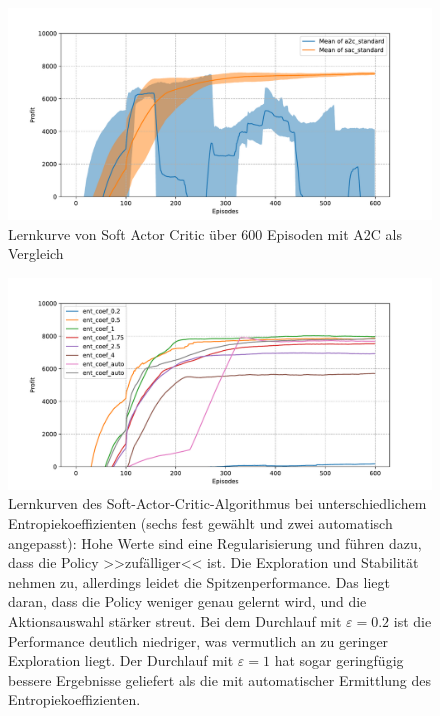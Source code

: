\begin{figure}[htb]
	\centering
	\includegraphics[width=\textwidth]{appendix/a2c_vs_sac.pdf}
	\caption{Lernkurve von Soft Actor Critic über 600 Episoden mit A2C als Vergleich}
	\label{graphic:SACvsA2CLearningCurve}
\end{figure}
\begin{figure}[htb]
	\centering
	\includegraphics[width=\textwidth]{appendix/sac_temperature.pdf}
	\caption{
		Lernkurven des Soft-Actor-Critic-Algorithmus bei unterschiedlichem Entropiekoeffizienten (sechs fest gewählt und zwei automatisch angepasst):
        Hohe Werte sind eine Regularisierung und führen dazu, dass die Policy >>zufälliger<< ist.
        Die Exploration und Stabilität nehmen zu, allerdings leidet die Spitzenperformance.
        Das liegt daran, dass die Policy weniger genau gelernt wird, und die Aktionsauswahl stärker streut.
        Bei dem Durchlauf mit $\varepsilon=0.2$ ist die Performance deutlich niedriger, was vermutlich an zu geringer Exploration liegt.
        Der Durchlauf mit $\varepsilon=1$ hat sogar geringfügig bessere Ergebnisse geliefert als die mit automatischer Ermittlung des Entropiekoeffizienten.
	}
	\label{graphic:SACTemperature}
\end{figure}
